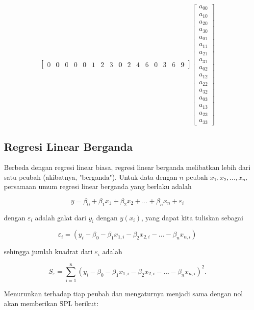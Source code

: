 \[\begin{bmatrix}
    0 & 0 & 0 & 0 & 0 & 1 & 2 & 3 & 0 & 2 & 4 & 6 & 0 & 3 & 6 & 9
\end{bmatrix} \begin{bmatrix}
    a_{00} \\
    a_{10} \\
    a_{20} \\
    a_{30} \\
    a_{01} \\
    a_{11} \\
    a_{21} \\
    a_{31} \\
    a_{02} \\
    a_{12} \\
    a_{22} \\
    a_{32} \\
    a_{03} \\
    a_{13} \\
    a_{23} \\
    a_{33}
\end{bmatrix}\]

\subsection{Regresi Linear Berganda}

Berbeda dengan regresi linear biasa, regresi linear berganda melibatkan lebih dari satu peubah (akibatnya, "berganda"). Untuk data dengan $n$ peubah $x_1, x_2, \ldots, x_n$, persamaan umum regresi linear berganda yang berlaku adalah

\[ y = \beta_0 + \beta_1 x_1 + \beta_2 x_2 + \ldots + \beta_n x_n + \varepsilon_i \]

dengan $\varepsilon_i$ adalah galat dari $y_i$ dengan $y(x_i)$, yang dapat kita tuliskan sebagai

\[ \varepsilon_i = (y_i - \beta_0 - \beta_1 x_{1,i} - \beta_2 x_{2,i} - \ldots - \beta_n x_{n,i}) \]

sehingga jumlah kuadrat dari $\varepsilon_i$ adalah

\[ S_\varepsilon = \sum_{i = 1}^n (y_i - \beta_0 - \beta_1 x_{1,i} - \beta_2 x_{2,i} - \ldots - \beta_n x_{n,i})^2. \]

Menurunkan terhadap tiap peubah dan mengaturnya menjadi sama dengan nol akan memberikan SPL berikut:

